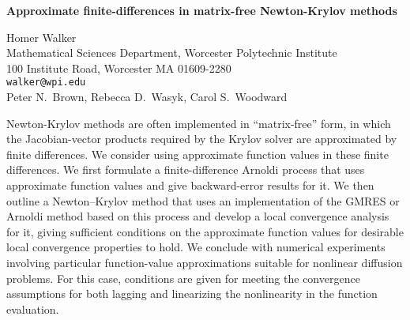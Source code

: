 \documentclass{report}
\begin{document}

\begin{center}
{\large
{\bf Approximate finite-differences in matrix-free Newton-Krylov methods}}

	Homer Walker \\
	Mathematical Sciences Department, Worcester Polytechnic Institute \\
	100 Institute Road, Worcester MA 01609-2280 \\
	{\tt walker@wpi.edu} \\
	Peter N.~Brown, Rebecca D.~Wasyk, Carol S.~Woodward
\end{center}
Newton-Krylov methods are often implemented in
``matrix-free'' form, in which the Jacobian-vector products
required by the Krylov solver are approximated by finite
differences. We consider using approximate function values
in these finite differences. We first formulate a
finite-difference Arnoldi process that uses approximate
function values and give backward-error results for it. We
then outline a Newton--Krylov method that uses an
implementation of the GMRES or Arnoldi method based on this
process and develop a local convergence analysis for it,
giving sufficient conditions on the approximate function
values for desirable local convergence properties to hold.
We conclude with numerical experiments involving particular
function-value approximations suitable for nonlinear
diffusion problems. For this case, conditions are given for
meeting the convergence assumptions for both lagging and
linearizing the nonlinearity in the function evaluation.



\end{document}
